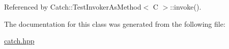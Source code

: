 Referenced by Catch\-::\-Test\-Invoker\-As\-Method$<$ C $>$\-::invoke().



The documentation for this class was generated from the following file\-:\begin{DoxyCompactItemize}
\item 
\hyperlink{catch_8hpp}{catch.\-hpp}\end{DoxyCompactItemize}
